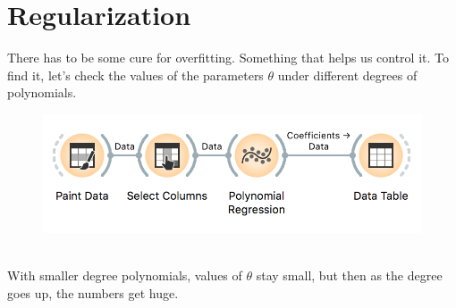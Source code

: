 \chapter{Regularization}
\label{ch:regularization}

There has to be some cure for overfitting. Something that helps us control it. To find it, let's check the values of the parameters $\theta$ under different degrees of polynomials.

\begin{figure}[h]
    \centering
    \includegraphics[scale=0.6]{workflow-overfitting.png}
    \caption{$\;$}
\end{figure}

With smaller degree polynomials, values of $\theta$ stay small, but then as the degree goes up, the numbers get huge.

